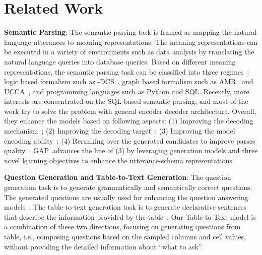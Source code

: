 \documentclass[letterpaper]{article} \usepackage{aaai21}  \usepackage{times}  \usepackage{helvet} \usepackage{courier}  \usepackage[hyphens]{url}  \usepackage{graphicx} \usepackage{booktabs}
\newcommand{\modelname}{\textsc{GAP~}}
\begin{document}
\section{Related Work}
\label{related_work}

\smallskip \noindent \textbf{Semantic Parsing}:
The semantic parsing task is framed as mapping the natural language utterances to meaning representations.
The meaning representations can be executed in a variety of environments such as data analysis by translating the natural language queries into database queries.
Based on different meaning representations, the semantic parsing task can be classified into three regimes~\cite{kamath2018survey}: logic based formalism such as -DCS~\cite{liang2013lambda}, graph based formalism such as AMR~\cite{banarescu2013abstract} and UCCA~\cite{abend2013universal}, and programming languages such as Python and SQL. 
Recently, more interests are concentrated on the SQL-based semantic parsing,
and most of the work try to solve the problem with general encoder-decoder architecture.
Overall, they enhance the models based on following aspects: 
(1) Improving the decoding mechanism~\cite{yin2017syntactic,dong2018coarse,rubin2020smbop};
(2) Improving the decoding target~\cite{guo2019towards};
(3) Improving the model encoding ability~\cite{wang2019rat, bogin2019global, yin2020tabert, scholak2020duorat, ma2020mention, deng2020structure, yu2020grappa};
(4) Reranking over the generated candidates to improve parses quality~\cite{kelkar2020bertrand, yin2019reranking}.
\modelname advances the line of (3) by leveraging generation models and three novel learning objectives to enhance the utterance-schema representations.

\smallskip \noindent \textbf{Question Generation and Table-to-Text Generation}:
The question generation task is to generate grammatically and semantically correct questions.
The generated questions are usually used for enhancing the question answering models~\cite{duan2017question, guo2018question, yu2020generating, zhong2020grounded}. 
The table-to-text generation task is to generate declarative sentences that describe the information provided by the table~\cite{liu2017table,gong2019table,parikh2020totto, radev2020dart}.
Our Table-to-Text model is a combination of these two directions, focusing on generating questions from table, i.e., composing questions based on the sampled columns and cell values, without providing the detailed information about ``what to ask''.
\end{document}
